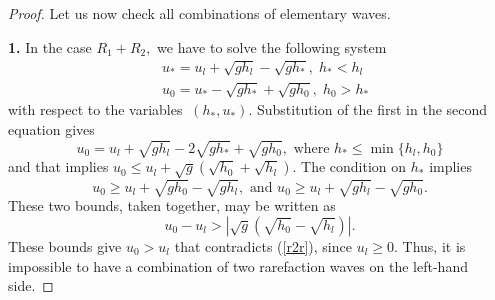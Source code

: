 \documentclass{article}
\theoremstyle{plain}
\theoremstyle{definition}
\theoremstyle{remark}
\begin{document}
\begin{proof}
Let us now check all combinations of elementary waves.

\noindent \textbf{1.}
In the case $R_{1} + R_{2}, $ we have to solve the following   system
\begin{equation*}
\begin{split}
& u_{\ast} = u_{l} + \sqrt{gh_{l}} - \sqrt{gh_{\ast}},\; h_{\ast}< h_{l} \\
& u_{0} = u_{\ast} - \sqrt{gh_{\ast}} + \sqrt{gh_{0}},\; h_{0}>h_{\ast}
\end{split}
\end{equation*}
with respect to the variables \(\ (h_{\ast},u_{\ast})\). Substitution of the first in the
second equation gives
\[u_{0} = u_{l} + \sqrt{gh_{l}} - 2\sqrt{gh_{\ast}} + \sqrt{gh_{0}},
\text{ where } h_{\ast}\leq \min \{h_{l},h_{0}\}\]
and that implies \( u_{0} \leq u_{l} + \sqrt{g}
\left( \sqrt{h_{0}} + \sqrt{h_{l}} \right)\). 
The condition on \({h}_{\ast}\) implies
\[u_{0} \geq u_{l} + \sqrt{gh_{0}} - \sqrt{gh_{l}},\text{ and } 
u_{0} \geq u_{l} + \sqrt{gh_{l}} - \sqrt{gh_{0}}.\]
These two bounds, taken together, may be written as
\[u_{0} - u_{l} > \left| \sqrt{g}\left( \sqrt{h_{0}} 
- \sqrt{h_{l}} \right) \right|.\]
These bounds give \(u_{0} > u_{l}\) that contradicts (\ref{r2r}),
since \(u_{l} \geq 0\). Thus, it is impossible to have a combination of 
two rarefaction waves on the left-hand side.


\end{proof}
\end{document}
